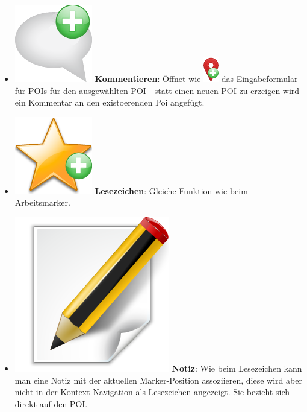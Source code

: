 \begin{itemize}[leftmargin=*,noitemsep,topsep=1ex,parsep=0pt,partopsep=0pt]
\item \includegraphics[scale=0.15]{bilder/icons/add-comment.png} \textbf{Kommentieren}: Öffnet wie \includegraphics[scale=0.55]{bilder/icons/add-marker.png} das Eingabeformular für POIs für den ausgewählten POI - statt einen neuen POI zu erzeigen wird ein Kommentar an den existoerenden Poi angefügt. 
\item \includegraphics[scale=0.15]{bilder/icons/add-bookmark.png} \textbf{Lesezeichen}: Gleiche Funktion wie beim Arbeitsmarker.  
\item \includegraphics[scale=0.07]{bilder/icons/edit-note.png} \textbf{Notiz}: Wie beim Lesezeichen kann man eine Notiz mit der aktuellen Marker-Position assoziieren, diese wird aber nicht in der Kontext-Navigation als Lesezeichen angezeigt. Sie bezieht sich direkt auf den POI.
\end{itemize}

